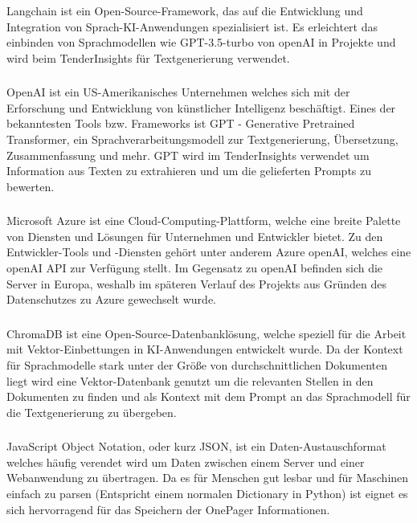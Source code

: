 \subsubsection{\textcite{langchain}}
Langchain ist ein Open-Source-Framework, das auf die Entwicklung und Integration von Sprach-KI-Anwendungen spezialisiert
ist. Es erleichtert das einbinden von Sprachmodellen wie GPT-3.5-turbo von openAI in Projekte und wird beim
TenderInsights für Textgenerierung verwendet.

\subsubsection{\textcite{openai-gpt}}
OpenAI ist ein US-Amerikanisches Unternehmen welches sich mit der Erforschung und Entwicklung von künstlicher
Intelligenz beschäftigt. Eines der bekanntesten Tools bzw. Frameworks ist GPT - Generative Pretrained Transformer, ein
Sprachverarbeitungsmodell zur Textgenerierung, Übersetzung, Zusammenfassung und mehr. GPT wird im TenderInsights
verwendet um Information aus Texten zu extrahieren und um die gelieferten Prompts zu bewerten.

\subsubsection{\textcite{azure}}
Microsoft Azure ist eine Cloud-Computing-Plattform, welche eine breite Palette von Diensten und Lösungen für Unternehmen
und Entwickler bietet. Zu den Entwickler-Tools und -Diensten gehört unter anderem Azure openAI, welches eine openAI API
zur Verfügung stellt. Im Gegensatz zu openAI befinden sich die Server in Europa, weshalb im späteren Verlauf des
Projekts aus Gründen des Datenschutzes zu Azure gewechselt wurde.

\subsubsection{\textcite{chromadb}}
ChromaDB ist eine Open-Source-Datenbanklösung, welche speziell für die Arbeit mit Vektor-Einbettungen in KI-Anwendungen
entwickelt wurde. Da der Kontext für Sprachmodelle stark unter der Größe von durchschnittlichen Dokumenten liegt wird
eine Vektor-Datenbank genutzt um die relevanten Stellen in den Dokumenten zu finden und als Kontext mit dem Prompt an
das Sprachmodell für die Textgenerierung zu übergeben.

\subsubsection{\textcite{json}}
JavaScript Object Notation, oder kurz JSON, ist ein Daten-Austauschformat welches häufig verendet wird um Daten zwischen
einem Server und einer Webanwendung zu übertragen. Da es für Menschen gut lesbar und für Maschinen einfach zu parsen
(Entspricht einem normalen Dictionary in Python) ist eignet es sich hervorragend für das Speichern der OnePager
Informationen.

